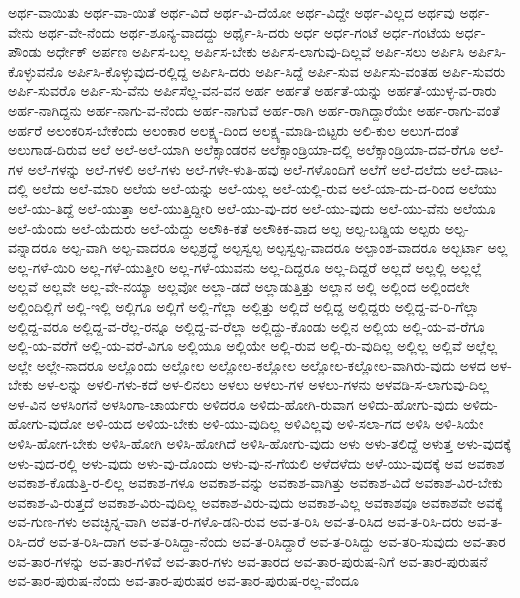 {ಅರ್ಥ-ವಾಯಿತು
ಅರ್ಥ-ವಾ-ಯಿತೆ
ಅರ್ಥ-ವಿದೆ
ಅರ್ಥ-ವಿ-ದೆಯೋ
ಅರ್ಥ-ವಿದ್ದೇ
ಅರ್ಥ-ವಿಲ್ಲದ
ಅರ್ಥವು
ಅರ್ಥ-ವೇನು
ಅರ್ಥ-ವೇ-ನೆಂದು
ಅರ್ಥ-ಶೂನ್ಯ-ವಾದದ್ದು
ಅರ್ಥೈ-ಸಿ-ದರು
ಅರ್ಧ
ಅರ್ಧ-ಗಂಟೆ
ಅರ್ಧ-ಗಂಟೆಯ
ಅರ್ಧ-ಪೌಂಡು
ಅರ್ಧೇಕ್
ಅರ್ಪಣ
ಅರ್ಪಿಸ-ಬಲ್ಲ
ಅರ್ಪಿಸ-ಬೇಕು
ಅರ್ಪಿಸ-ಲಾಗುವು-ದಿಲ್ಲವೆ
ಅರ್ಪಿ-ಸಲು
ಅರ್ಪಿಸಿ
ಅರ್ಪಿಸಿ-ಕೊಳ್ಳುವನೊ
ಅರ್ಪಿಸಿ-ಕೊಳ್ಳುವುದ-ರಲ್ಲಿದ್ದ
ಅರ್ಪಿಸಿ-ದರು
ಅರ್ಪಿ-ಸಿದ್ದೆ
ಅರ್ಪಿ-ಸುವ
ಅರ್ಪಿಸು-ವಂತಹ
ಅರ್ಪಿ-ಸುವರು
ಅರ್ಪಿ-ಸುವರೊ
ಅರ್ಪಿ-ಸು-ವೆನು
ಅರ್ಪಿಸೆಲ್ಲ-ವನ-ವನ
ಅರ್ಹ
ಅರ್ಹತೆ
ಅರ್ಹತೆ-ಯನ್ನು
ಅರ್ಹತೆ-ಯುಳ್ಳ-ವ-ರಾರು
ಅರ್ಹ-ನಾಗಿದ್ದನು
ಅರ್ಹ-ನಾಗು-ವ-ನೆಂದು
ಅರ್ಹ-ನಾಗುವೆ
ಅರ್ಹ-ರಾಗಿ
ಅರ್ಹ-ರಾಗಿದ್ದಾರೆಯೇ
ಅರ್ಹ-ರಾಗು-ವಂತೆ
ಅರ್ಹರೆ
ಅಲಂಕರಿಸ-ಬೇಕೆಂದು
ಅಲಂಕಾರ
ಅಲಕ್ಷ್ಯ-ದಿಂದ
ಅಲಕ್ಷ್ಯ-ಮಾಡಿ-ಬಿಟ್ಟರು
ಅಲಿ-ಕುಲ
ಅಲುಗ-ದಂತೆ
ಅಲುಗಾಡ-ದಿರುವ
ಅಲೆ
ಅಲೆ-ಅಲೆ-ಯಾಗಿ
ಅಲೆಕ್ಸಾಂಡರನ
ಅಲೆಕ್ಸಾಂಡ್ರಿಯಾ-ದಲ್ಲಿ
ಅಲೆಕ್ಸಾಂಡ್ರಿಯಾ-ದವ-ರೆಗೂ
ಅಲೆ-ಗಳ
ಅಲೆ-ಗಳನ್ನು
ಅಲೆ-ಗಳಲಿ
ಅಲೆ-ಗಳು
ಅಲೆ-ಗಳೇ-ಳುತಿ-ಹವು
ಅಲೆ-ಗಳೊಂದಿಗೆ
ಅಲೆಗೆ
ಅಲೆ-ದಲೆದು
ಅಲೆ-ದಾಟ-ದಲ್ಲಿ
ಅಲೆದು
ಅಲೆ-ಮಾರಿ
ಅಲೆಯ
ಅಲೆ-ಯನ್ನು
ಅಲೆ-ಯಲ್ಲ
ಅಲೆ-ಯಲ್ಲಿ-ರುವ
ಅಲೆ-ಯಾ-ದು-ದ-ರಿಂದ
ಅಲೆಯು
ಅಲೆ-ಯು-ತಿದ್ದೆ
ಅಲೆ-ಯುತ್ತಾ
ಅಲೆ-ಯುತ್ತಿದ್ದೀರಿ
ಅಲೆ-ಯು-ವು-ದರ
ಅಲೆ-ಯು-ವುದು
ಅಲೆ-ಯು-ವೆನು
ಅಲೆಯೂ
ಅಲೆ-ಯೆಂದು
ಅಲೆ-ಯೆದುರು
ಅಲೆ-ಯೆದ್ದು
ಅಲೌಕಿ-ಕತೆ
ಅಲೌಕಿಕ-ವಾದ
ಅಲ್ಪ
ಅಲ್ಪ-ಬಡ್ಡಿಯ
ಅಲ್ಪರು
ಅಲ್ಪ-ವನ್ನಾದರೂ
ಅಲ್ಪ-ವಾಗಿ
ಅಲ್ಪ-ವಾದರೂ
ಅಲ್ಪಶ್ರದ್ಧೆ
ಅಲ್ಪಸ್ವಲ್ಪ
ಅಲ್ಪಸ್ವಲ್ಪ-ವಾದರೂ
ಅಲ್ಪಾಂಶ-ವಾದರೂ
ಅಲ್ಬರ್ಟಾ
ಅಲ್ಲ
ಅಲ್ಲ-ಗಳೆ-ಯಿರಿ
ಅಲ್ಲ-ಗಳೆ-ಯುತ್ತೀರಿ
ಅಲ್ಲ-ಗಳೆ-ಯುವನು
ಅಲ್ಲ-ದಿದ್ದರೂ
ಅಲ್ಲ-ದಿದ್ದರೆ
ಅಲ್ಲದೆ
ಅಲ್ಲಲ್ಲಿ
ಅಲ್ಲಲ್ಲೆ
ಅಲ್ಲವೆ
ಅಲ್ಲವೇ
ಅಲ್ಲ-ವೇ-ನಯ್ಯಾ
ಅಲ್ಲವೋ
ಅಲ್ಲಾ-ಡದೆ
ಅಲ್ಲಾಡುತ್ತಿತ್ತು
ಅಲ್ಲಾನ
ಅಲ್ಲಿ
ಅಲ್ಲಿಂದ
ಅಲ್ಲಿಂದಲೇ
ಅಲ್ಲಿಂದಿಲ್ಲಿಗೆ
ಅಲ್ಲಿ-ಇಲ್ಲಿ
ಅಲ್ಲಿಗೂ
ಅಲ್ಲಿಗೆ
ಅಲ್ಲಿ-ಗೆಲ್ಲಾ
ಅಲ್ಲಿತ್ತು
ಅಲ್ಲಿದೆ
ಅಲ್ಲಿದ್ದ
ಅಲ್ಲಿದ್ದರು
ಅಲ್ಲಿದ್ದ-ವ-ರಿ-ಗೆಲ್ಲಾ
ಅಲ್ಲಿದ್ದ-ವರೂ
ಅಲ್ಲಿದ್ದ-ವ-ರೆಲ್ಲ-ರನ್ನೂ
ಅಲ್ಲಿದ್ದ-ವ-ರೆಲ್ಲಾ
ಅಲ್ಲಿದ್ದು-ಕೊಂಡು
ಅಲ್ಲಿನ
ಅಲ್ಲಿಯ
ಅಲ್ಲಿ-ಯ-ವ-ರೆಗೂ
ಅಲ್ಲಿ-ಯ-ವರೆಗೆ
ಅಲ್ಲಿ-ಯ-ವರೆ-ವಿಗೂ
ಅಲ್ಲಿಯೂ
ಅಲ್ಲಿಯೇ
ಅಲ್ಲಿ-ರುವ
ಅಲ್ಲಿ-ರು-ವುದಿಲ್ಲ
ಅಲ್ಲಿಲ್ಲ
ಅಲ್ಲಿವೆ
ಅಲ್ಲೆಲ್ಲ
ಅಲ್ಲೇ
ಅಲ್ಲೇ-ನಾದರೂ
ಅಲ್ಲೊಂದು
ಅಲ್ಲೋಲ
ಅಲ್ಲೋಲ-ಕಲ್ಲೋಲ
ಅಲ್ಲೋಲ-ಕಲ್ಲೋಲ-ವಾಗಿರು-ವುದು
ಅಳದ
ಅಳ-ಬೇಕು
ಅಳ-ಲನ್ನು
ಅಳಲಿ-ಗಳು-ಕದೆ
ಅಳ-ಲಿನಲು
ಅಳಲು
ಅಳಲು-ಗಳ
ಅಳಲು-ಗಳನು
ಅಳವಡಿ-ಸ-ಲಾಗುವು-ದಿಲ್ಲ
ಅಳ-ವಿನ
ಅಳಸಿಂಗನೆ
ಅಳಸಿಂಗಾ-ಚಾರ್ಯರು
ಅಳಿದರೂ
ಅಳಿದು-ಹೋಗಿ-ರುವಾಗ
ಅಳಿದು-ಹೋಗು-ವುದು
ಅಳಿದು-ಹೋಗು-ವುದೋ
ಅಳಿ-ಯದ
ಅಳಿಯ-ಬೇಕು
ಅಳಿ-ಯು-ವುದಿಲ್ಲ
ಅಳಿವಿಲ್ಲವು
ಅಳಿ-ಸಲಾ-ಗದ
ಅಳಿಸಿ
ಅಳಿ-ಸಿಯೇ
ಅಳಿಸಿ-ಹೋಗ-ಬೇಕು
ಅಳಿಸಿ-ಹೋಗಿ
ಅಳಿಸಿ-ಹೋಗಿದೆ
ಅಳಿಸಿ-ಹೋಗು-ವುದು
ಅಳು
ಅಳು-ತಲಿದ್ದೆ
ಅಳುತ್ತ
ಅಳು-ವುದಕ್ಕೆ
ಅಳು-ವುದ-ರಲ್ಲಿ
ಅಳು-ವುದು
ಅಳು-ವು-ದೊಂದು
ಅಳು-ವು-ನ-ಗೆಯಲಿ
ಅಳೆದಳೆದು
ಅಳೆ-ಯು-ವುದಕ್ಕೆ
ಅವ
ಅವಕಾಶ
ಅವಕಾಶ-ಕೊಡುತ್ತಿ-ರ-ಲಿಲ್ಲ
ಅವಕಾಶ-ಗಳೂ
ಅವಕಾಶ-ವನ್ನು
ಅವಕಾಶ-ವಾಗಿತ್ತು
ಅವಕಾಶ-ವಿದೆ
ಅವಕಾಶ-ವಿರ-ಬೇಕು
ಅವಕಾಶ-ವಿ-ರುತ್ತದೆ
ಅವಕಾಶ-ವಿರು-ವುದಿಲ್ಲ
ಅವಕಾಶ-ವಿರು-ವುದು
ಅವಕಾಶ-ವಿಲ್ಲ
ಅವಕಾಶವೂ
ಅವಕಾಶವೇ
ಅವಕ್ಕೆ
ಅವ-ಗುಣ-ಗಳು
ಅವಚ್ಛಿನ್ನ-ವಾಗಿ
ಅವತ-ರ-ಗಳೊ-ಡನಿ-ರುವ
ಅವ-ತ-ರಿಸಿ
ಅವ-ತ-ರಿಸಿದ
ಅವ-ತ-ರಿಸಿ-ದರು
ಅವ-ತ-ರಿಸಿ-ದರೆ
ಅವ-ತ-ರಿಸಿ-ದಾಗ
ಅವ-ತ-ರಿಸಿದ್ದಾ-ನೆಂದು
ಅವ-ತ-ರಿಸಿದ್ದಾರೆ
ಅವ-ತ-ರಿಸಿದ್ದು
ಅವ-ತರಿ-ಸುವುದು
ಅವ-ತಾರ
ಅವ-ತಾರ-ಗಳನ್ನು
ಅವ-ತಾರ-ಗಳಿವೆ
ಅವ-ತಾರ-ಗಳು
ಅವ-ತಾರದ
ಅವ-ತಾರ-ಪುರುಷ-ನಿಗೆ
ಅವ-ತಾರ-ಪುರುಷನೆ
ಅವ-ತಾರ-ಪುರುಷ-ನೆಂದು
ಅವ-ತಾರ-ಪುರುಷರ
ಅವ-ತಾರ-ಪುರುಷ-ರಲ್ಲ-ವೆಂದೂ
}
